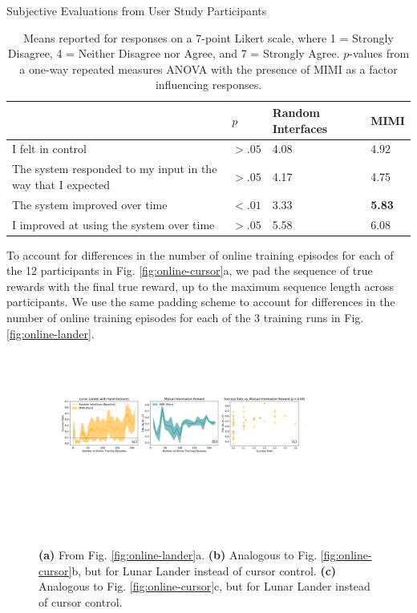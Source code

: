\documentclass{article}
\begin{document}
\begin{table}[t]
  \caption{Subjective Evaluations from User Study Participants}
  \centering
\small
\begin{tabular}{llll}
\toprule
{} &   $p$ & Random Interfaces & MIMI \\
\midrule
I felt in control & $>.05$ & 4.08 & 4.92 \\
The system responded to my input in the way that I expected & $>.05$ & 4.17 & 4.75 \\
The system improved over time & $\mathbf{<.01}$ & 3.33 & \textbf{5.83} \\
I improved at using the system over time & $>.05$ & 5.58 & 6.08  \\
\bottomrule
\end{tabular}
  \caption*{Means reported for responses on a 7-point Likert scale, where 1 = Strongly Disagree, 4 = Neither Disagree nor Agree, and 7 = Strongly Agree. $p$-values from a one-way repeated measures ANOVA with the presence of MIMI as a factor influencing responses.}
  \label{tab:user-study-survey}
\end{table}

To account for differences in the number of online training episodes for each of the 12 participants in Fig. \ref{fig:online-cursor}a, we pad the sequence of true rewards with the final true reward, up to the maximum sequence length across participants.
We use the same padding scheme to account for differences in the number of online training episodes for each of the 3 training runs in Fig. \ref{fig:online-lander}.

\begin{figure}[t]
    \centering
    \includegraphics[width=\linewidth]{lander-appendix.pdf}
    \caption{\textbf{(a)} From Fig. \ref{fig:online-lander}a. \textbf{(b)} Analogous to Fig. \ref{fig:online-cursor}b, but for Lunar Lander instead of cursor control. \textbf{(c)} Analogous to Fig. \ref{fig:online-cursor}c, but for Lunar Lander instead of cursor control.}
    \label{fig:lander-appendix}
\end{figure}
\end{document}
